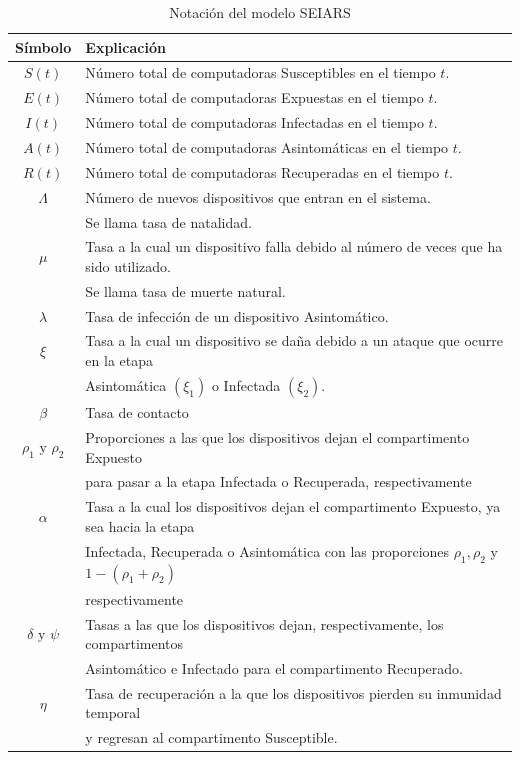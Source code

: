 \begin{table}[ht]
    \centering %
    \begin{tabular}{c| l}
        Símbolo & Explicación \\ \hline
        $S(t)$ &  Número total de computadoras Susceptibles en el tiempo $t$.\\
        $E(t)$ &  Número total de computadoras Expuestas en el tiempo $t$.\\
        $I(t)$ &  Número total de computadoras Infectadas en el tiempo $t$.\\
        $A(t)$ &  Número total de computadoras Asintomáticas en el tiempo $t$.\\
        $R(t)$ &  Número total de computadoras Recuperadas en el tiempo $t$.\\
        $\Lambda$ & Número de nuevos dispositivos que entran en el sistema.\\
            & Se llama tasa de natalidad. \\ 
        $\mu$   &  Tasa a la cual un dispositivo falla debido al número de veces que ha sido utilizado.\\
                & Se llama tasa de muerte natural.\\ 
        $\lambda$ & Tasa de infección de un dispositivo Asintomático. \\ 
        $\xi$ &  Tasa a la cual un dispositivo se daña debido a un ataque que ocurre en la etapa\\
              & Asintomática $(\xi_1)$ o Infectada $(\xi_2)$.\\ 
        $\beta$ &  Tasa de contacto\\ 
        $\rho_1\text{ y }\rho_2$ & Proporciones a las que los dispositivos dejan el compartimento Expuesto \\
                & para pasar a la etapa Infectada o Recuperada, respectivamente \\ 
        $\alpha$ &  Tasa a la cual los dispositivos dejan el compartimento Expuesto, ya sea hacia la etapa \\
            & Infectada, Recuperada o Asintomática con las proporciones $\rho_1,\rho_2$ y $1-(\rho_1+\rho_2)$ \\ 
            & respectivamente\\ 
        $\delta\text{ y }\psi$ & Tasas a las que los dispositivos dejan, respectivamente, los compartimentos\\
        & Asintomático e Infectado para el compartimento Recuperado. \\ 
        $\eta$ &  Tasa de recuperación a la que los dispositivos pierden su inmunidad temporal \\
            & y regresan al compartimento Susceptible.\\ 
    \end{tabular}
    \caption{Notación del modelo SEIARS}
    \label{tab:SEIARS_notation}
\end{table}